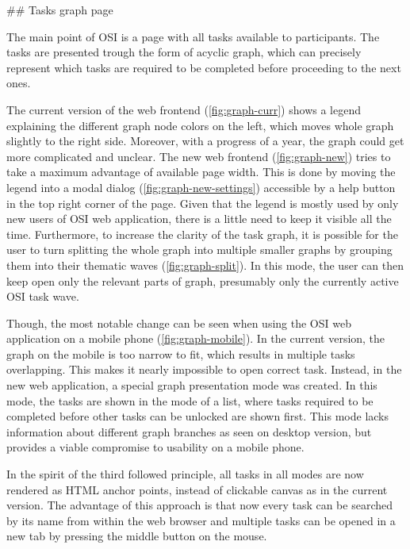 \documentclass[
  digital, %
  oneside, %
  lof,     %
  lot,     %
]{fithesis4}
\begin{document}
{## Tasks graph page

The main point of OSI is a page with all tasks available to participants. The tasks are presented trough the form of acyclic graph, which can precisely represent which tasks are required to be completed before proceeding to the next ones.

The current version of the web frontend (\ref{fig:graph-curr}) shows a legend explaining the different graph node colors on the left, which moves whole graph slightly to the right side. Moreover, with a progress of a year, the graph could get more complicated and unclear. The new web frontend (\ref{fig:graph-new}) tries to take a maximum advantage of available page width. This is done by moving the legend into a modal dialog (\ref{fig:graph-new-settings}) accessible by a help button in the top right corner of the page. Given that the legend is mostly used by only new users of OSI web application, there is a little need to keep it visible all the time. Furthermore, to increase the clarity of the task graph, it is possible for the user to turn splitting the whole graph into multiple smaller graphs by grouping them into their thematic waves (\ref{fig:graph-split}). In this mode, the user can then keep open only the relevant parts of graph, presumably only the currently active OSI task wave.

Though, the most notable change can be seen when using the OSI web application on a mobile phone (\ref{fig:graph-mobile}). In the current version, the graph on the mobile is too narrow to fit, which results in multiple tasks overlapping. This makes it nearly impossible to open correct task. Instead, in the new web application, a special graph presentation mode was created. In this mode, the tasks are shown in the mode of a list, where tasks required to be completed before other tasks can be unlocked are shown first. This mode lacks information about different graph branches as seen on desktop version, but provides a viable compromise to usability on a mobile phone.

In the spirit of the third followed principle, all tasks in all modes are now rendered as HTML anchor points, instead of clickable canvas as in the current version. The advantage of this approach is that now every task can be searched by its name from within the web browser and multiple tasks can be opened in a new tab by pressing the middle button on the mouse.

}
\end{document}
